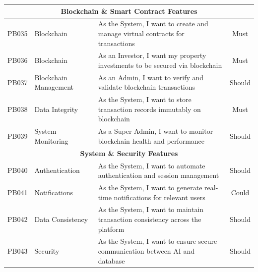 \begin{longtable}{|c|l|p{8cm}|c|}
    \multicolumn{4}{|c|}{\cellcolor{primary!15}\textbf{\textcolor{primary}{Blockchain \& Smart Contract Features}}} \\
    \hline
    PB035 & Blockchain & As the System, I want to create and manage virtual contracts for transactions & Must \\
    \hline
    PB036 & Blockchain & As an Investor, I want my property investments to be secured via blockchain & Must \\
    \hline
    PB037 & Blockchain Management & As an Admin, I want to verify and validate blockchain transactions & Should \\
    \hline
    PB038 & Data Integrity & As the System, I want to store transaction records immutably on blockchain & Must \\
    \hline
    PB039 & System Monitoring & As a Super Admin, I want to monitor blockchain health and performance & Should \\
    \hline
    
    \multicolumn{4}{|c|}{\cellcolor{primary!15}\textbf{\textcolor{primary}{System \& Security Features}}} \\
    \hline
    PB040 & Authentication & As the System, I want to automate authentication and session management & Should \\
    \hline
    PB041 & Notifications & As the System, I want to generate real-time notifications for relevant users & Could \\
    \hline
    PB042 & Data Consistency & As the System, I want to maintain transaction consistency across the platform & Should \\
    \hline
    PB043 & Security & As the System, I want to ensure secure communication between AI and database & Should \\
    \hline
    

\end{longtable}

